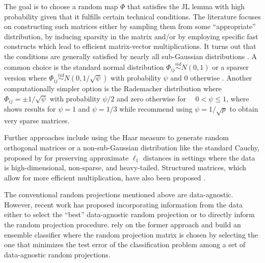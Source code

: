 \documentclass[
  article,
  nojss]{jss}
\begin{document}
The goal is to choose a random map \(\Phi\) that satisfies the JL lemma
with high probability given that it fulfills certain technical
conditions. The literature focuses on constructing such matrices either
by sampling them from some ``appropriate'' distribution, by inducing
sparsity in the matrix and/or by employing specific fast constructs
which lead to efficient matrix-vector multiplications. It turns out that
the conditions are generally satisfied by nearly all sub-Gaussian
distributions \citep{matouvsek2008variants}. A common choice is the
standard normal distribution \(\Phi_{ij} \overset{iid}{\sim} N(0,1)\)
\citep{FRANKL1988JLSphere} or a sparser version where
\(\Phi_{ij}\overset{iid}{\sim} N(0,1/\sqrt{\psi})\) with probability
\(\psi\) and \(0\) otherwise \citep{matouvsek2008variants}. Another
computationally simpler option is the Rademacher distribution where
\(\Phi_{ij} =  \pm 1/\sqrt{\psi}\) with probability \(\psi/2\) and zero
otherwise for \(\quad 0<\psi\leq 1\), where \citet{ACHLIOPTAS2003JL}
shows results for \(\psi=1\) and \(\psi=1/3\) while
\citet{LiHastie2006VerySparseRP} recommend using \(\psi=1/\sqrt{p}\) to
obtain very sparse matrices.

Further approaches include using the Haar measure to generate random
orthogonal matrices \citep{cannings2017random} or a non-sub-Gaussian
distribution like the standard Cauchy, proposed by
\citet{LiHastie2006VerySparseRP} for preserving approximate \(\ell_1\)
distances in settings where the data is high-dimensional, non-sparse,
and heavy-tailed. Structured matrices, which allow for more efficient
multiplication, have also been proposed \citep[see
e.g.,][]{ailon2009fast, Clarkson2013LowRankApprox}.

The conventional random projections mentioned above are data-agnostic.
However, recent work has proposed incorporating information from the
data either to select the ``best'' data-agnostic random projection or to
directly inform the random projection procedure.
\citet{cannings2017random} rely on the former approach and build an
ensemble classifier where the random projection matrix is chosen by
selecting the one that minimizes the test error of the classification
problem among a set of data-agnostic random projections.
\end{document}
